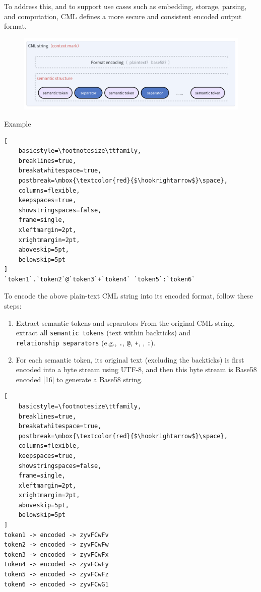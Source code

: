\documentclass[conference]{IEEEtran}
\begin{document}
To address this, and to support use cases such as embedding, storage,
parsing, and computation, CML defines a more secure and consistent
encoded output format.

\begin{figure}[htbp]
\centering
\includegraphics[width=0.8\linewidth]{assets/image-20250418171524138.png}
\end{figure}

Example

\begin{lstlisting}[
    basicstyle=\footnotesize\ttfamily,
    breaklines=true,
    breakatwhitespace=true,
    postbreak=\mbox{\textcolor{red}{$\hookrightarrow$}\space},
    columns=flexible,
    keepspaces=true,
    showstringspaces=false,
    frame=single,
    xleftmargin=2pt,
    xrightmargin=2pt,
    aboveskip=5pt,
    belowskip=5pt
]
`token1`.`token2`@`token3`+`token4` `token5`:`token6`
\end{lstlisting}

To encode the above plain-text CML string into its encoded format,
follow these steps:

\begin{enumerate}
\def\labelenumi{\arabic{enumi}.}
\item
  Extract semantic tokens and separators From the original CML string,
  extract all \texttt{semantic\ tokens} (text within backticks) and
  \texttt{relationship\ separators} (e.g., \texttt{.}, \texttt{@},
  \texttt{+}, \texttt{}, \texttt{:}).
\item
  For each semantic token, its original text (excluding the backticks)
  is first encoded into a byte stream using UTF-8, and then this byte
  stream is Base58 encoded {[}16{]} to generate a Base58 string.
\end{enumerate}

\begin{lstlisting}[
    basicstyle=\footnotesize\ttfamily,
    breaklines=true,
    breakatwhitespace=true,
    postbreak=\mbox{\textcolor{red}{$\hookrightarrow$}\space},
    columns=flexible,
    keepspaces=true,
    showstringspaces=false,
    frame=single,
    xleftmargin=2pt,
    xrightmargin=2pt,
    aboveskip=5pt,
    belowskip=5pt
]
token1 -> encoded -> zyvFCwFv
token2 -> encoded -> zyvFCwFw
token3 -> encoded -> zyvFCwFx
token4 -> encoded -> zyvFCwFy
token5 -> encoded -> zyvFCwFz
token6 -> encoded -> zyvFCwG1
\end{lstlisting}
\end{document}
